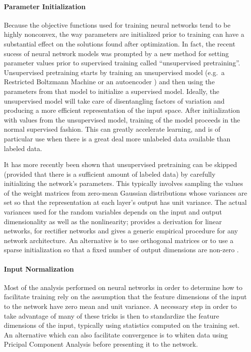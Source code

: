 \paragraph{Parameter Initialization}

Because the objective functions used for training neural networks tend to be highly nonconvex, the way parameters are initialized prior to training can have a substantial effect on the solutions found after optimization.
In fact, the recent sucess of neural network models was prompted by a new method for setting parameter values prior to supervised training called ``unsupervised pretraining''.
Unsupervised pretraining starts by training an unsupervised model (e.g.\ a Restricted Boltzmann Machine \cite{} or an autoencoder \cite{}) and then using the parameters from that model to initialize a supervised model.
Ideally, the unsupervised model will take care of disentangling factors of variation and producing a more efficient representation of the input space.
After initialization with values from the unsupervised model, training of the model proceeds in the normal supervised fashion.
This can greatly accelerate learning, and is of particular use when there is a great deal more unlabeled data available than labeled data.

It has more recently been shown that unsupervised pretraining can be skipped (provided that there is a sufficient amount of labeled data) by carefully initializing the network's parameters.
This typically involves sampling the values of the weight matrices from zero-mean Gaussian distributions whose variances are set so that the representation at each layer's output has unit variance.
The actual variances used for the random variables depends on the input and output dimensionality as well as the nonlinearity; \cite{} provides a derivation for linear networks, \cite{} for rectifier networks and \cite{} gives a generic empirical procedure for any network architecture.
An alternative is to use orthogonal matrices \cite{} or to use a sparse initialization so that a fixed number of output dimensions are non-zero \cite{}.


\paragraph{Input Normalization}

Most of the analysis performed on neural networks in order to determine how to facilitate training rely on the assumption that the feature dimensions of the input to the network have zero mean and unit variance.
A necessary step in order to take advantage of many of these tricks is then to standardize the feature dimensions of the input, typically using statistics computed on the training set.
An alternative which can also facilitate convergence is to whiten data using Pricipal Component Analysis before presenting it to the network.

